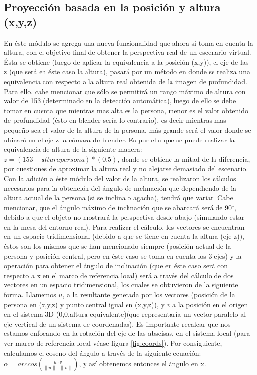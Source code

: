 \documentclass[a4paper,openright,12pt]{report}
\begin{document}
\subsection{Proyección basada en la posición y altura (x,y,z)}
En éste módulo se agrega una nueva funcionalidad que ahora si toma en cuenta la altura, con el objetivo final de obtener la perspectiva real de un escenario virtual. Ésta se obtiene (luego de aplicar la equivalencia a la posición (x,y)), el eje de las z (que será en éste caso la altura), pasará por un método en donde se realiza una equivalencia con respecto a la altura real obtenida de la imagen de profundidad. Para ello, cabe mencionar que sólo se permitirá un rango máximo de altura con valor de 153 (determinado en la detección automática), luego de ello se debe tomar en cuenta que mientras mas alta es la persona, menor es el valor obtenido de profundidad (ésto en blender sería lo contrario), es decir mientras mas pequeño sea el valor de la altura de la persona, más grande será el valor donde se ubicará en el eje z la cámara de blender. Es por ello que se puede realizar la equivalencia de altura de la siguiente manera: $z = (153 - altura persona)*(0.5)$, donde se obtiene la mitad de la diferencia, por cuestiones de aproximar la altura real y no alejarse demasiado del escenario.\\
Con la adición a éste módulo del valor de la altura, se realizaron los cálculos necesarios para la obtención del ángulo de inclinación que dependiendo de la altura actual de la persona (si se inclina o agacha), tendrá que variar. Cabe mencionar, que el ángulo máximo de inclinación que se abarcará será de 90$^{\circ}$, debido a que el objeto no mostrará la perspectiva desde abajo (simulando estar en la mesa del entorno real). Para realizar el cálculo, los vectores se encuentran en un espacio tridimensional (debido a que se tiene en cuenta la altura (eje z)), éstos son los mismos que se han mencionado siempre (posición actual de la persona y posición central, pero en éste caso se toma en cuenta los 3 ejes) y la operación para obtener el ángulo de inclinación (que en éste caso será con respecto a x en el marco de referencia local) será a través del cálculo de dos vectores en un espacio tridimensional, los cuales se obtuvieron de la siguiente forma. Llamemos $u$, a la resultante generada por los vectores (posición de la persona en (x,y,z) y punto central igual en (x,y,z)), y $v$ a la posición en el origen en el sistema 3D (0,0,altura equivalente)(que representaría un vector paralelo al eje vertical de un sistema de coordenadas). Es importante recalcar que nos estamos enfocando en la rotación del eje de las abscisas, en el sistema local (para ver marco de referencia local véase figura \ref{fig:coords}). Por consiguiente, calculamos el coseno del ángulo a través de la siguiente ecuación: \(\alpha =arccos(\frac { u·v }{ \left\| u \right\| ·\left\| v \right\|  } )\), y así obtenemos entonces el ángulo en x.
\end{document}
